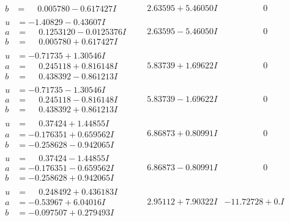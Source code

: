 \documentclass[1p]{elsarticle_modified}
\theoremstyle{definition}
\begin{document}
$$\begin{array}{c|c|c}
\begin{aligned}
b &= \phantom{-}0.005780 - 0.617427 I\end{aligned}
 & \phantom{-}2.63595 + 5.46050 I & \phantom{-0.000000 } 0 \\ \hline\begin{aligned}
u &= -1.40829 - 0.43607 I \\
a &= \phantom{-}0.1253120 - 0.0125376 I \\
b &= \phantom{-}0.005780 + 0.617427 I\end{aligned}
 & \phantom{-}2.63595 - 5.46050 I & \phantom{-0.000000 } 0 \\ \hline\begin{aligned}
u &= -0.71735 + 1.30546 I \\
a &= \phantom{-}0.245118 + 0.816148 I \\
b &= \phantom{-}0.438392 - 0.861213 I\end{aligned}
 & \phantom{-}5.83739 + 1.69622 I & \phantom{-0.000000 } 0 \\ \hline\begin{aligned}
u &= -0.71735 - 1.30546 I \\
a &= \phantom{-}0.245118 - 0.816148 I \\
b &= \phantom{-}0.438392 + 0.861213 I\end{aligned}
 & \phantom{-}5.83739 - 1.69622 I & \phantom{-0.000000 } 0 \\ \hline\begin{aligned}
u &= \phantom{-}0.37424 + 1.44855 I \\
a &= -0.176351 + 0.659562 I \\
b &= -0.258628 - 0.942065 I\end{aligned}
 & \phantom{-}6.86873 + 0.80991 I & \phantom{-0.000000 } 0 \\ \hline\begin{aligned}
u &= \phantom{-}0.37424 - 1.44855 I \\
a &= -0.176351 - 0.659562 I \\
b &= -0.258628 + 0.942065 I\end{aligned}
 & \phantom{-}6.86873 - 0.80991 I & \phantom{-0.000000 } 0 \\ \hline\begin{aligned}
u &= \phantom{-}0.248492 + 0.436183 I \\
a &= -0.53967 + 6.04016 I \\
b &= -0.097507 + 0.279493 I\end{aligned}
 & \phantom{-}2.95112 + 7.90322 I & -11.72728 + 0. I\phantom{ +0.000000I} \\ \hline\begin{aligned}

\end{aligned}
\end{array}$$
\end{document}
